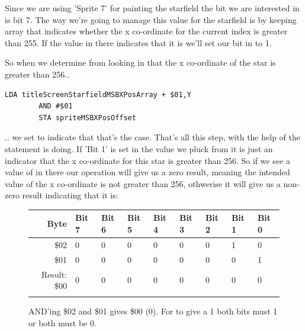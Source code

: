 Since we are using 'Sprite 7' for painting the starfield the bit we are interested in is bit 7. The way
we're going to manage this value for the starfield is by keeping array 
that indicates whether the x co-ordinate for the current index is greater than 255. If the value in there
indicates that it is we'll set our bit in  to 1.

So when
we determine from looking in  that the x co-ordinate of the star is greater
than 256..

\begin{lstlisting}[basicstyle=\tiny]
        LDA titleScreenStarfieldMSBXPosArray + $01,Y
        AND #$01
        STA spriteMSBXPosOffset
\end{lstlisting}

.. we set  to indicate that that's the case. That's all this step, with the help
of the  statement is doing. If 'Bit 1' is
set in the value we pluck from  it is just an indicator that the x co-ordinate
for this star is greater than 256. So if we see a value of  in there our operation  will
give us a zero result, meaning the intended value of the x co-ordinate is not greater than 256, othwerise it will give
us a non-zero result indicating that it is:

\begin{figure}[H]
  {
    \setlength{\tabcolsep}{3.0pt}
    \setlength\cmidrulewidth{\heavyrulewidth} %
    \begin{adjustbox}{width=10cm,center}

      \begin{tabular}{rllllllll}
        \toprule
        Byte & Bit 7 & Bit 6 & Bit 5 & Bit 4 & Bit 3 & Bit 2 & Bit 1 & Bit 0        \\
        \midrule
        \$02 & 0 & 0 & 0 & 0 & 0 & 0 & 1 & 0 \\
        \$01 & 0 & 0 & 0 & 0 & 0 & 0 & 0 & 1 \\
        \midrule
        Result: \$00 & 0 & 0 & 0 & 0 & 0 & 0 & 0 & 0 \\
        \addlinespace
        \bottomrule
      \end{tabular}
    \end{adjustbox}
  }\caption*{AND'ing \$02 and \$01 gives \$00 (0). For  to give a 1 both bits must 1 or both must be 0.}
\end{figure}

